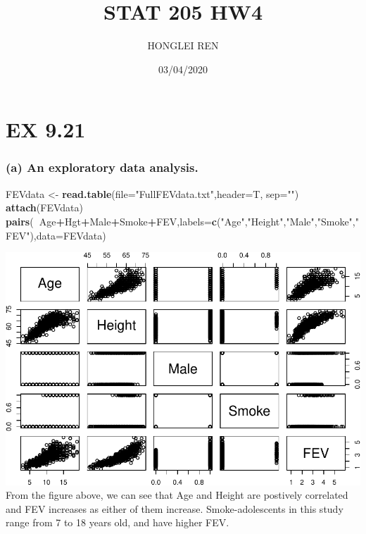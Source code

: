 \documentclass[
]{article}
\title{STAT 205 HW4}
\author{HONGLEI REN}
\date{03/04/2020}
\newenvironment{Shaded}{\begin{snugshade}}{\end{snugshade}}
\newcommand{\DataTypeTok}[1]{\textcolor[rgb]{0.13,0.29,0.53}{#1}}
\newcommand{\KeywordTok}[1]{\textcolor[rgb]{0.13,0.29,0.53}{\textbf{#1}}}
\newcommand{\NormalTok}[1]{#1}
\newcommand{\OperatorTok}[1]{\textcolor[rgb]{0.81,0.36,0.00}{\textbf{#1}}}
\newcommand{\StringTok}[1]{\textcolor[rgb]{0.31,0.60,0.02}{#1}}
\begin{document}
\maketitle

\hypertarget{ex-9.21}{%
\section{EX 9.21}\label{ex-9.21}}

\hypertarget{a-an-exploratory-data-analysis.}{%
\subsubsection{(a) An exploratory data
analysis.}\label{a-an-exploratory-data-analysis.}}

\begin{Shaded}
\begin{Highlighting}[]
\NormalTok{  FEVdata <-}\StringTok{ }\KeywordTok{read.table}\NormalTok{(}\DataTypeTok{file=}\StringTok{"FullFEVdata.txt"}\NormalTok{,}\DataTypeTok{header=}\NormalTok{T, }\DataTypeTok{sep=}\StringTok{""}\NormalTok{) }
  \KeywordTok{attach}\NormalTok{(FEVdata)}
  \KeywordTok{pairs}\NormalTok{(}\OperatorTok{~}\NormalTok{Age}\OperatorTok{+}\NormalTok{Hgt}\OperatorTok{+}\NormalTok{Male}\OperatorTok{+}\NormalTok{Smoke}\OperatorTok{+}\NormalTok{FEV,}\DataTypeTok{labels=}\KeywordTok{c}\NormalTok{(}\StringTok{"Age"}\NormalTok{,}\StringTok{"Height"}\NormalTok{,}\StringTok{"Male"}\NormalTok{,}\StringTok{"Smoke"}\NormalTok{,}\StringTok{"FEV"}\NormalTok{),}\DataTypeTok{data=}\NormalTok{FEVdata)}
\end{Highlighting}
\end{Shaded}

\includegraphics{STAT_205_HW4_files/figure-latex/unnamed-chunk-1-1.pdf}
From the figure above, we can see that Age and Height are postively
correlated and FEV increases as either of them increase.
Smoke-adolescents in this study range from 7 to 18 years old, and have
higher FEV.
\end{document}
